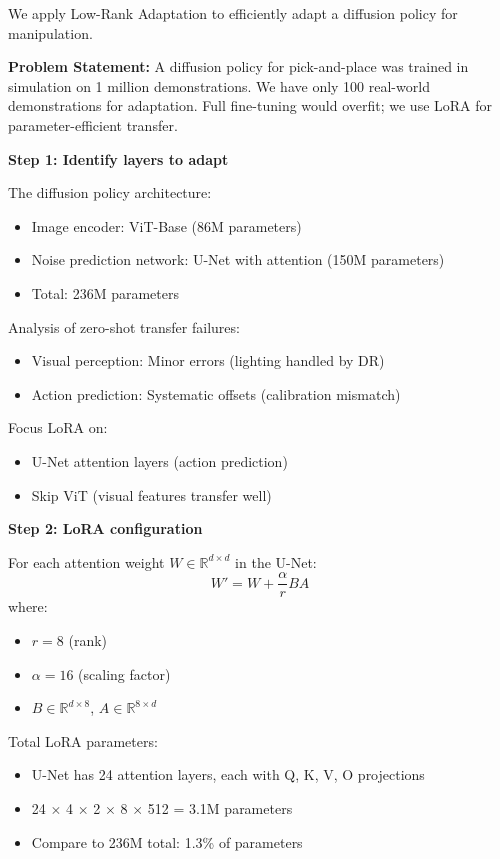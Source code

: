 \begin{example}
\label{ex:lora_finetuning}
We apply Low-Rank Adaptation to efficiently adapt a diffusion policy for manipulation.

\textbf{Problem Statement:}
A diffusion policy for pick-and-place was trained in simulation on 1 million demonstrations. We have only 100 real-world demonstrations for adaptation. Full fine-tuning would overfit; we use LoRA for parameter-efficient transfer.

\textbf{Step 1: Identify layers to adapt}

The diffusion policy architecture:
\begin{itemize}
    \item Image encoder: ViT-Base (86M parameters)
    \item Noise prediction network: U-Net with attention (150M parameters)
    \item Total: 236M parameters
\end{itemize}

Analysis of zero-shot transfer failures:
\begin{itemize}
    \item Visual perception: Minor errors (lighting handled by DR)
    \item Action prediction: Systematic offsets (calibration mismatch)
\end{itemize}

Focus LoRA on:
\begin{itemize}
    \item U-Net attention layers (action prediction)
    \item Skip ViT (visual features transfer well)
\end{itemize}

\textbf{Step 2: LoRA configuration}

For each attention weight $W \in \mathbb{R}^{d \times d}$ in the U-Net:
\begin{equation}
W' = W + \frac{\alpha}{r} BA
\end{equation}
where:
\begin{itemize}
    \item $r = 8$ (rank)
    \item $\alpha = 16$ (scaling factor)
    \item $B \in \mathbb{R}^{d \times 8}$, $A \in \mathbb{R}^{8 \times d}$
\end{itemize}

Total LoRA parameters:
\begin{itemize}
    \item U-Net has 24 attention layers, each with Q, K, V, O projections
    \item 24 $\times$ 4 $\times$ 2 $\times$ 8 $\times$ 512 = 3.1M parameters
    \item Compare to 236M total: 1.3\% of parameters
\end{itemize}


\end{example}
